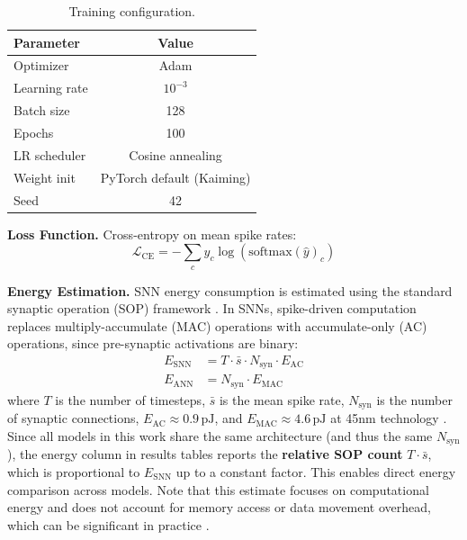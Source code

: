 \documentclass{article}
\theoremstyle{plain}
\theoremstyle{definition}
\theoremstyle{remark}
\begin{document}
\begin{table}[h]
\caption{Training configuration.}
\label{tab:training}
\vskip 0.1in
\begin{center}
\begin{small}
\begin{tabular}{lc}
\toprule
Parameter & Value \\
\midrule
Optimizer & Adam \\
Learning rate & $10^{-3}$ \\
Batch size & 128 \\
Epochs & 100 \\
LR scheduler & Cosine annealing \\
Weight init & PyTorch default (Kaiming) \\
Seed & 42 \\
\bottomrule
\end{tabular}
\end{small}
\end{center}
\vskip -0.1in
\end{table}

\textbf{Loss Function.} Cross-entropy on mean spike rates:
\begin{equation}
\mathcal{L}_\text{CE} = -\sum_c y_c \log(\text{softmax}(\hat{y})_c)
\end{equation}

\textbf{Energy Estimation.} SNN energy consumption is estimated using the standard synaptic operation (SOP) framework \citep{lemaire2023analytical}. In SNNs, spike-driven computation replaces multiply-accumulate (MAC) operations with accumulate-only (AC) operations, since pre-synaptic activations are binary:
\begin{align}
E_\text{SNN} &= T \cdot \bar{s} \cdot N_\text{syn} \cdot E_\text{AC} \\
E_\text{ANN} &= N_\text{syn} \cdot E_\text{MAC}
\end{align}
where $T$ is the number of timesteps, $\bar{s}$ is the mean spike rate, $N_\text{syn}$ is the number of synaptic connections, $E_\text{AC} \approx 0.9\,\text{pJ}$, and $E_\text{MAC} \approx 4.6\,\text{pJ}$ at 45nm technology \citep{horowitz20141}. Since all models in this work share the same architecture (and thus the same $N_\text{syn}$), the energy column in results tables reports the \textbf{relative SOP count} $T \cdot \bar{s}$, which is proportional to $E_\text{SNN}$ up to a constant factor. This enables direct energy comparison across models. Note that this estimate focuses on computational energy and does not account for memory access or data movement overhead, which can be significant in practice \citep{yan2024reconsidering}.
\end{document}
